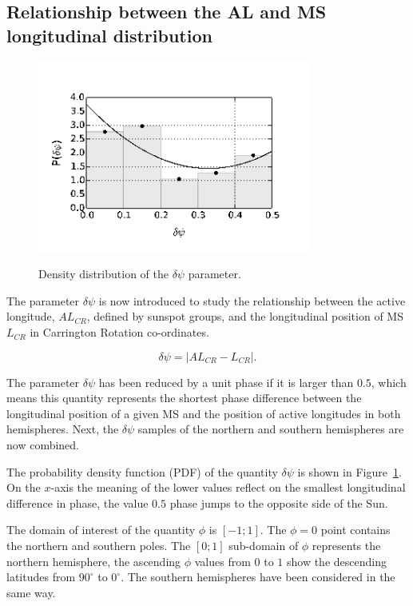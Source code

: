 \subsection{Relationship between the AL and MS longitudinal distribution}

\begin{figure}
	\centering
	{\includegraphics[width=90mm]{Chapter4/Figs/stat}}
	{\caption{Density distribution of the $\delta\psi$ parameter. }\label{stat}}
\end{figure}	

The parameter $\delta\psi$ is now introduced to study the relationship between the active longitude, $AL_{CR}$, defined by sunspot groups, and the longitudinal position of MS $L_{CR}$ in Carrington Rotation co-ordinates. 

\begin{equation}
\delta\psi = \left| AL_{CR} - L_{CR}\right|.
\end{equation}

The parameter $\delta\psi$ has been reduced by a unit phase if it is larger than $0.5$, which means this quantity represents the shortest phase difference between the longitudinal position of a given MS and the position of active longitudes in both hemispheres. 
Next, the $\delta\psi$ samples of the northern and southern hemispheres are now combined. 

The probability density function (PDF) of the quantity $\delta\psi$ is shown in Figure~\ref{stat}. On the $x$-axis the meaning of the lower values reflect on the smallest longitudinal difference in phase, the value $0.5$ phase jumps to the opposite side of the Sun.

The domain of interest of the quantity $\phi$ is $[-1;1]$. 
The $\phi=0$ point contains the northern and southern poles.
The $[0;1]$ sub-domain of $\phi$ represents the northern hemisphere, the ascending $\phi$ values from $0$ to $1$ show the descending latitudes from $90^{\circ}$ to $0^{\circ}$. 
The southern hemispheres have been considered in the same way.

